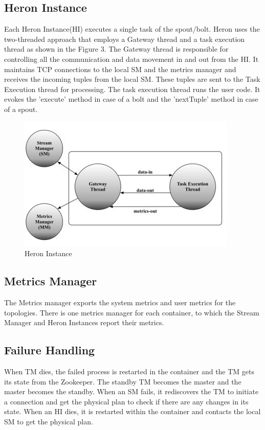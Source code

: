 \documentclass[9pt,twocolumn,twoside]{styles/osajnl}
\begin{document}
\subsection{Heron Instance}
Each Heron Instance(HI) executes a single task of the spout/bolt. Heron uses the two-threaded approach that employs a Gateway thread and a task execution thread as shown in the Figure 3. The Gateway thread is responsible for controlling all the communication and data movement in and out from the HI. It maintains TCP connections to the local SM and the metrics manager and receives the incoming tuples from the local SM. These tuples are sent to the Task Execution thread for processing. The task execution thread runs the user code. It evokes the 'execute' method in case of a bolt and the 'nextTuple' method in case of a spout.
\begin{figure}[htbp]
\begin{center}
\centering
\includegraphics[width=\linewidth]{images/img3}
\caption{Heron Instance}
\label{fig:false-color}
\end{center}
\end{figure}
\subsection{Metrics Manager}
The Metrics manager exports the system metrics and user metrics for the topologies. There is one metrics
manager for each container, to which the Stream Manager and Heron Instances report their metrics.
\subsection{Failure Handling}
When TM dies, the failed process is restarted in the container and the TM gets its state from the Zookeeper. The standby TM becomes the master and the master becomes the standby. When an SM fails, it rediscovers the TM to initiate a connection and get the physical plan to check if there are any changes in its state. When an HI dies, it is restarted within the container and contacts the local SM to get the physical plan.\cite{TwitterHeron4}
\end{document}
